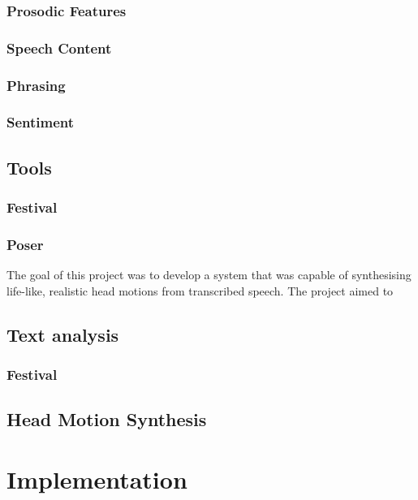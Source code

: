 \documentclass[bsc,frontabs,twoside,singlespacing,parskip]{infthesis}
\begin{document}
\subsection{Prosodic Features}
\subsection{Speech Content}
\subsection{Phrasing}
\subsection{Sentiment}
\section{Tools}
\subsection{Festival}
\subsection{Poser}


The goal of this project was to develop a system that was capable of synthesising life-like, realistic head motions from transcribed speech. The project aimed to 
\section{Text analysis}
\subsection{Festival}

\section{Head Motion Synthesis}

\chapter{Implementation}
\end{document}
